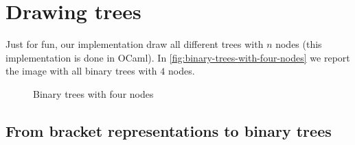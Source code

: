 \section{Drawing trees}

Just for fun, our implementation draw all different trees with $n$
nodes (this implementation is done in OCaml). In
\autoref{fig:binary-trees-with-four-nodes} we report the image with
all binary trees with $4$ nodes.
\begin{figure}[htb]
  \centering
  \caption{Binary trees with four nodes}
  \label{fig:binary-trees-with-four-nodes}
\end{figure}

\subsection{From bracket representations to binary trees}


